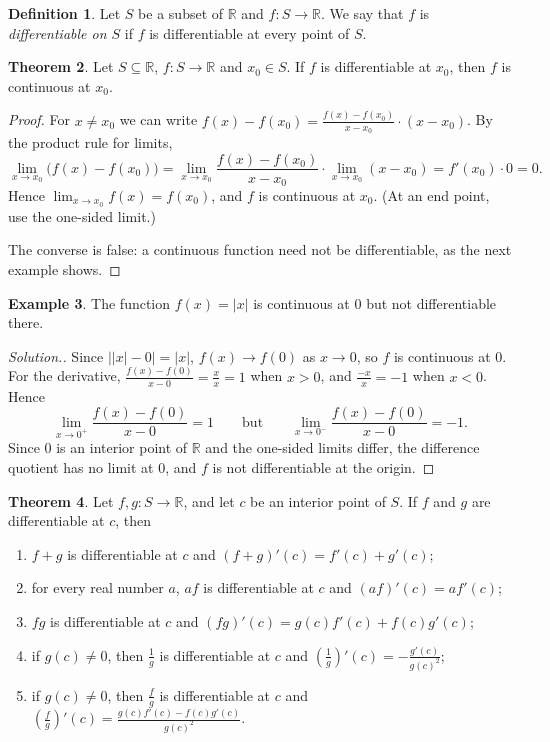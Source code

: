 \documentclass[11pt,a4paper]{article}
\numberwithin{equation}{section}
\theoremstyle{definition}
\newtheorem{thm}{Theorem}[subsection]
\newtheorem{defn}[thm]{Definition}
\newtheorem{exa}[thm]{Example}
\newenvironment{solution}
  {\renewcommand{\qedsymbol}{}\begin{proof}[\textit{Solution}.]}
  {\end{proof}}
\begin{document}
\begin{defn}
Let $S$ be a subset of $\mathbb{R}$ and $f: S\longrightarrow \mathbb{R}$. We say that $f$ is \emph{differentiable on $S$} if $f$ is differentiable at every point of $S$.
\end{defn}


\begin{thm}
Let $S\subseteq\mathbb{R}$, $f: S\longrightarrow \mathbb{R}$ and $x_0\in S$. If $f$ is differentiable at $x_0$, then $f$ is continuous at $x_0$.
\end{thm}

\begin{proof}
For $x\neq x_0$ we can write $f(x) - f(x_0) = \frac{f(x) - f(x_0)}{x - x_0}\cdot(x - x_0)$. By the product rule for limits,
$$\lim_{x\rightarrow x_0}\bigl(f(x) - f(x_0)\bigr) = \lim_{x\rightarrow x_0} \frac{f(x) - f(x_0)}{x - x_0}\cdot \lim_{x\rightarrow x_0}(x - x_0) = f'(x_0)\cdot 0 = 0 .$$
Hence $\lim_{x\rightarrow x_0} f(x) = f(x_0)$, and $f$ is continuous at $x_0$. (At an end point, use the one-sided limit.)

The converse is false: a continuous function need not be differentiable, as the next example shows.
\end{proof}


\begin{exa}
The function $f(x) = |x|$ is continuous at $0$ but not differentiable there.
\end{exa}

\begin{solution}
Since $\bigl||x| - 0\bigr| = |x|$, $f(x)\longrightarrow f(0)$ as $x\longrightarrow0$, so $f$ is continuous at $0$. For the derivative, $\frac{f(x) - f(0)}{x - 0} = \frac{x}{x}= 1$ when $x> 0$, and $\frac{-x}{x} = -1$ when $x < 0$. Hence
$$\lim_{x\rightarrow 0^+} \frac{f(x) - f(0)}{x - 0} = 1 \qquad\text{but}\qquad \lim_{x\rightarrow 0^-}\frac{f(x) - f(0)}{x - 0} = -1 .$$
Since $0$ is an interior point of $\mathbb{R}$ and the one-sided limits differ, the difference quotient has no limit at $0$, and $f$ is not differentiable at the origin.
\end{solution}


\begin{thm}
Let $f, g: S\longrightarrow \mathbb{R}$, and let $c$ be an interior point of $S$. If $f$ and $g$ are differentiable at $c$, then
\begin{enumerate}
\item[(a)] $f+ g$ is differentiable at $c$ and $(f + g)'(c) = f'(c) + g'(c)$;
\item[(b)] for every real number $a$, $af$ is differentiable at $c$ and $(af)'(c) = a f'(c)$;
\item[(c)] $fg$ is differentiable at $c$ and $(fg)'(c) = g(c) f'(c) + f(c) g'(c)$;
\item[(d)] if $g(c)\neq 0$, then $\frac{1}{g}$ is differentiable at $c$ and $\left(\frac{1}{g}\right)'(c) = -\frac{g'(c)}{g(c)^2}$;
\item[(e)] if $g(c)\neq 0$, then $\frac{f}{g}$ is differentiable at $c$ and $\left(\frac{f}{g}\right)'(c) = \frac{g(c) f'(c) - f(c) g'(c)}{g(c)^2}$.
\end{enumerate}
\end{thm}
\end{document}
